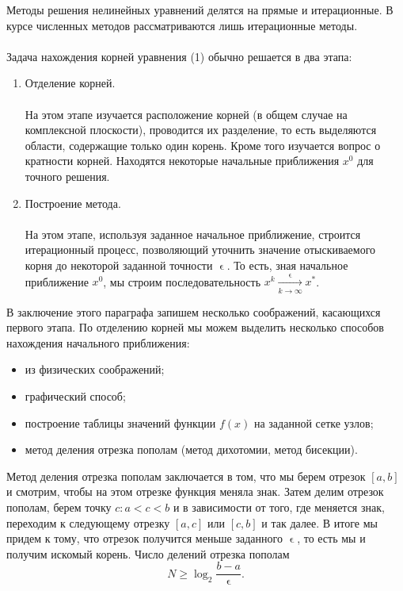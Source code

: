 \documentclass[a4paper, 12pt]{report}
\numberwithin{equation}{section}
\renewcommand{\geq}{\geqslant}
\renewcommand{\varepsilon}{\upvarepsilon}
\begin{document}
	Методы решения нелинейных уравнений делятся на прямые и итерационные. В курсе численных методов рассматриваются лишь итерационные методы. \\\\
	Задача нахождения корней уравнения (1) обычно решается в два этапа:
	\begin{enumerate}
		\item Отделение корней.\\\\
		На этом этапе изучается расположение корней (в общем случае на комплексной плоскости), проводится их разделение, то есть выделяются области, содержащие только один корень. Кроме того изучается вопрос о кратности корней. Находятся некоторые начальные приближения $x^0$ для точного решения.
		\item Построение метода.
		\\\\
		На этом этапе, используя заданное начальное приближение, строится итерационный процесс, позволяющий уточнить значение отыскиваемого корня до некоторой заданной точности $\varepsilon$. То есть, зная начальное приближение $x^0$, мы строим последовательность $x^k \xrightarrow[k\to\infty]{\varepsilon}x^*$.
	\end{enumerate}
	В заключение этого параграфа запишем несколько соображений, касающихся первого этапа. По отделению корней мы можем выделить несколько способов нахождения начального приближения:
	\begin{itemize}
		\item из физических соображений;
		\item графический способ;
		\item построение таблицы значений функции $f(x)$ на заданной сетке узлов;
		\item метод деления отрезка пополам (метод дихотомии, метод бисекции).
	\end{itemize}
	Метод деления отрезка пополам заключается в том, что мы берем отрезок $[a,b]$ и смотрим, чтобы на этом отрезке функция меняла знак. Затем делим отрезок пополам, берем точку $c : a<c<b$ и в зависимости от того, где меняется знак, переходим к следующему отрезку $[a,c]$ или $[c,b]$ и так далее. В итоге мы придем к тому, что отрезок получится меньше заданного $\varepsilon$, то есть мы и получим искомый корень. Число делений отрезка пополам $$N \geq \log_2 \dfrac{b-a}{\varepsilon}.$$
\end{document}
